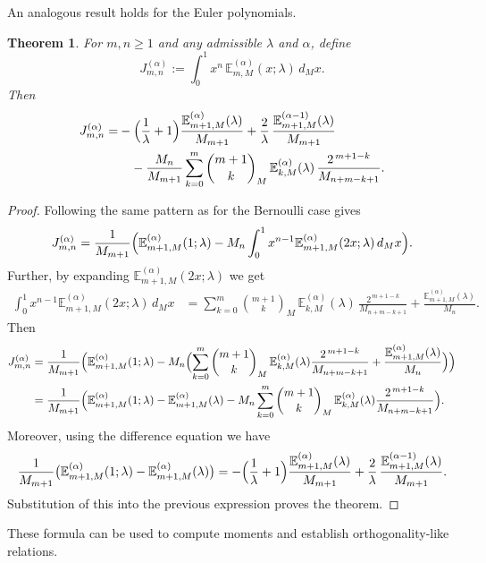 \documentclass[10pt,a4paper]{amsart}
\newtheorem{theorem}{Theorem}[section]
\numberwithin{equation}{section}
\newcommand{\E}{\mathbb{E}}
\begin{document}
An analogous result holds for the Euler polynomials.
\begin{theorem}\label{thm:int-euler-recurrence}
For $m,n\ge 1$ and any admissible $\lambda$ and $\alpha$, define
\[
J_{m,n}^{(\alpha)}:=\int_0^1 x^n\,\E_{m,M}^{(\alpha)}(x;\lambda)\,d_M x.
\]
Then
\begin{equation}\label{eq:euler-recurrence}
\begin{aligned}
J_{m,n}^{(\alpha)} = &-\Bigl(\frac{1}{\lambda}+1\Bigr)\frac{\E_{m+1,M}^{(\alpha)}(\lambda)}{M_{m+1}}
      +\frac{2}{\lambda}\,\frac{\E_{m+1,M}^{(\alpha-1)}(\lambda)}{M_{m+1}} \\
     &\quad- \frac{M_n}{M_{m+1}}\sum_{k=0}^{m}\binom{m+1}{k}_M\,
        \E_{k,M}^{(\alpha)}(\lambda)\,\frac{2^{\,m+1-k}}{M_{n+m-k+1}}.
\end{aligned}
\end{equation}
\end{theorem}

\begin{proof}
Following the same pattern as for the Bernoulli case gives
\[
J_{m,n}^{(\alpha)}=\frac{1}{M_{m+1}}\Bigl(
   \E_{m+1,M}^{(\alpha)}(1;\lambda)
   -M_n\int_0^1 x^{n-1}\E_{m+1,M}^{(\alpha)}(2x;\lambda)\,d_M x\Bigr).
\]
Further, by expanding $\E_{m+1,M}^{(\alpha)}(2x;\lambda)$ we get
\begin{align*}
\int_0^1 x^{n-1}\E_{m+1,M}^{(\alpha)}(2x;\lambda)\,d_M x
   &= \sum_{k=0}^{m}\binom{m+1}{k}_M\,
      \E_{k,M}^{(\alpha)}(\lambda)\,\frac{2^{\,m+1-k}}{M_{n+m-k+1}}
     + \frac{\E_{m+1,M}^{(\alpha)}(\lambda)}{M_n}.
\end{align*}
Then
\begin{align*}
J_{m,n}^{(\alpha)} &=\frac{1}{M_{m+1}}\Bigl(
   \E_{m+1,M}^{(\alpha)}(1;\lambda)
   -M_n\Bigl(\sum_{k=0}^{m}\binom{m+1}{k}_M\,
      \E_{k,M}^{(\alpha)}(\lambda)\frac{2^{\,m+1-k}}{M_{n+m-k+1}}
      +\frac{\E_{m+1,M}^{(\alpha)}(\lambda)}{M_n}\Bigr)\Bigr)\\
&=\frac{1}{M_{m+1}}\Bigl(
   \E_{m+1,M}^{(\alpha)}(1;\lambda)-\E_{m+1,M}^{(\alpha)}(\lambda)
   -M_n\sum_{k=0}^{m}\binom{m+1}{k}_M\,
      \E_{k,M}^{(\alpha)}(\lambda)\frac{2^{\,m+1-k}}{M_{n+m-k+1}}\Bigr).
\end{align*}
Moreover, using the difference equation we have
\[
\frac{1}{M_{m+1}}\bigl(\E_{m+1,M}^{(\alpha)}(1;\lambda)-\E_{m+1,M}^{(\alpha)}(\lambda)\bigr)
   = -\Bigl(\frac{1}{\lambda}+1\Bigr)\frac{\E_{m+1,M}^{(\alpha)}(\lambda)}{M_{m+1}}
     +\frac{2}{\lambda}\,\frac{\E_{m+1,M}^{(\alpha-1)}(\lambda)}{M_{m+1}}.
\]
Substitution of this into the previous expression proves the theorem.  
\end{proof}
These formula can be used to compute moments and establish orthogonality-like relations.
\end{document}
